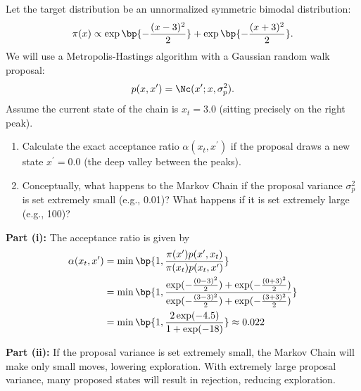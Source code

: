 \documentclass{article}
\begin{document}
\begin{homeworkProblem}

  Let the target distribution be an unnormalized symmetric bimodal distribution:
  \[
    \pi(x) \propto \exp \bp{-\frac{(x-3)^2}{2}} + \exp\bp{-\frac{(x+3)^2}{2}}.
  \]
  We will use a Metropolis-Hastings algorithm with a Gaussian random walk proposal:
  \[
    p(x, x^{\prime}) = \Nc(x^{\prime}; x, \sigma_p^2).
  \]
  Assume the current state of the chain is $x_t = 3.0$ (sitting precisely on the right peak).
  \begin{enumerate}[label=(\roman*), topsep=5pt, itemsep=5pt]
    \item Calculate the exact acceptance ratio $\alpha(x_t, x^{\prime})$ if the proposal draws a new state $x^{\prime} = 0.0$ (the deep valley between the peaks).
    \item Conceptually, what happens to the Markov Chain if the proposal variance $\sigma_p^2$ is set extremely
          small (e.g., 0.01)? What happens if it is set extremely large (e.g., 100)? \newline
  \end{enumerate}

  \solution

  \textbf{Part (i):} The acceptance ratio is given by
  \begin{align*}
    \alpha(x_t, x^{\prime}) & = \min\bp{1, \frac{\pi(x^{\prime}) p(x^{\prime}, x_t)}{\pi(x_t) p(x_t, x^{\prime})}}                                          \\
                            & = \min\bp{1, \frac{\exp(-\frac{(0-3)^2}{2}) + \exp(-\frac{(0+3)^2}{2})}{\exp(-\frac{(3-3)^2}{2}) + \exp(-\frac{(3+3)^2}{2})}} \\
                            & = \min\bp{1, \frac{2\exp(-4.5)}{1 + \exp(-18)}} \approx 0.022
  \end{align*}

  \textbf{Part (ii):} If the proposal variance is set extremely small, the Markov Chain will make only small moves, lowering exploration. With extremely large proposal variance, many proposed states will result in rejection, reducing exploration.

\end{homeworkProblem}
\end{document}
